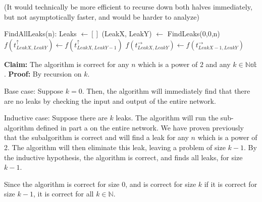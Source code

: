 \documentclass[11pt]{article}
\begin{document}
(It would technically be more efficient to recurse down both halves immediately, but not asymptotically faster, and would be harder to analyze)

\begin{algorithmic}[H]
\State FindAllLeaks(n):
    \State Leaks $\gets []$
        \State (LeakX, LeakY) $\gets$ FindLeaks(0,0,n)
        \State $f(t^{\uparrow}_{LeakX, LeakY}) \gets f(t^{\uparrow}_{LeakX, LeakY-1})$
        \State $f(t^{\rightarrow}_{LeakX, LeakY}) \gets f(t^{\rightarrow}_{LeakX-1, LeakY})$
    \EndWhile
    
\end{algorithmic}

\textbf{Claim: } The algorithm is correct for any $n$ which is a power of $2$ and any $k \in \mathbb{Nat}$.
\textbf{Proof: } By recursion on $k$. 

Base case:
Suppose $k = 0$. Then, the algorithm will immediately find that there are no leaks by checking the input and output of the entire network.

Inductive case:
Suppose there are $k$ leaks. The algorithm will run the sub-algorithm defined in part a on the entire network. We have proven previously that the subalgorithm is correct and will find a leak for any $n$ which is a power of 2. The algorithm will then eliminate this leak, leaving a problem of size $k-1$. By the inductive hypothesis, the algorithm is correct, and finds all leaks, for size $k-1$. 

Since the algorithm is correct for size $0$, and is correct for size $k$ if it is correct for size $k-1$, it is correct for all $k \in \mathbb{N}$. 
\end{document}
